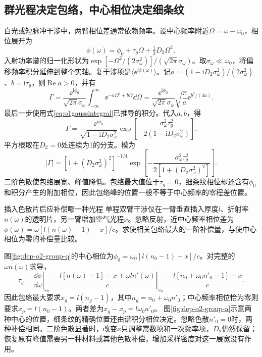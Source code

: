 \subsection{群光程决定包络，中心相位决定细条纹}
白光或短脉冲干涉中，两臂相位差通常依赖频率。设中心频率附近$\Omega=\omega-\omega_0$，相位展开为
\[
 \phi(\omega)=\phi_0+\tau_g\Omega+\tfrac12D_2\Omega^2,
\]
入射功率谱的归一化形状为$\exp[-\Omega^2/(2\sigma_\omega^2)]/(\sqrt{2\pi}\sigma_\omega)$。取$\sigma_\omega\ll\omega_0$，将偏移频率积分延伸到整个实轴。复干涉项是$\langle\ee^{\mathrm i\phi(\omega)}\rangle$。记$a=(1-\mathrm iD_2\sigma_\omega^2)/(2\sigma_\omega^2)$、$b=\mathrm i\tau_g$，则$\operatorname{Re}a>0$，并有
\[
 \Gamma=\frac{\ee^{\mathrm i\phi_0}}{\sqrt{2\pi}\sigma_\omega}
 \int_{-\infty}^{\infty}\ee^{-a\Omega^2+b\Omega}\dd\Omega
 =\frac{\ee^{\mathrm i\phi_0}}{\sqrt{2\pi}\sigma_\omega}
 \sqrt{\frac\pi a}\ee^{b^2/(4a)}.
\]
最后一步使用式\eqref{eq:o1gaussintegral}已推导的积分。代入$a,b$，得
\[
 \Gamma=\frac{\ee^{\mathrm i\phi_0}}{\sqrt{1-\mathrm iD_2\sigma_\omega^2}}
 \exp\!\left[-\frac{\sigma_\omega^2\tau_g^2}
 {2(1-\mathrm iD_2\sigma_\omega^2)}\right].
\]
平方根取在$D_2=0$处连续为1的分支。模为
\[
 |\Gamma|=[1+(D_2\sigma_\omega^2)^2]^{-1/4}
 \exp\!\left[-\frac{\sigma_\omega^2\tau_g^2}
 {2[1+(D_2\sigma_\omega^2)^2]}\right].
\]
二阶色散使包络展宽、峰值降低。包络最大值位于$\tau_g=0$，细条纹相位却还含有$\phi_0$和积分产生的附加相位，因此包络峰的位置一般不等于中心频率的零程差位置。

\begin{example}插入色散片后应补偿哪一种光程
单程双臂干涉仪在一臂垂直插入厚度$l$、折射率$n(\omega)$的透明片，另一臂增加空气光程$x$。忽略反射，近中心频率相位差为$\phi(\omega)=\omega[l(n(\omega)-1)-x]/c$。求使相关包络最大的一阶补偿量，与使中心相位为零的补偿量比较。
\end{example}
\begin{solution}
图\ref{fig:dep-o2-group-q}的中心相位为$\phi_0=\omega_0[l(n_0-1)-x]/c$。对完整的$\omega n(\omega)$求导，
\[
 \tau_g=\left.\frac{\dd\phi}{\dd\omega}\right|_{\omega_0}
 =\left.\frac{l[n(\omega)-1]-x+\omega l n'(\omega)}c\right|_{\omega_0}
 =\frac{l[n_0+\omega_0n'_0-1]-x}{c}.
\]
因此包络最大要求$x_g=l(n_g-1)$，其中$n_g=n_0+\omega_0n'_0$；中心频率相位恰为零则要求$x_p=l(n_0-1)$。两者差为$x_g-x_p=l\omega_0n'_0$。
图\ref{fig:dep-o2-group-a}示意两种中心的位置，细条纹的精确位置还由谱积分相位决定。忽略色散$n'_0=0$时，两种补偿相同。二阶色散显著时，改变$x$只调整常数项和一次频率项，$D_2$仍然保留；恢复原有峰值需要另一种材料或其他色散补偿，增加采样密度对这一展宽没有作用。
\end{solution}
